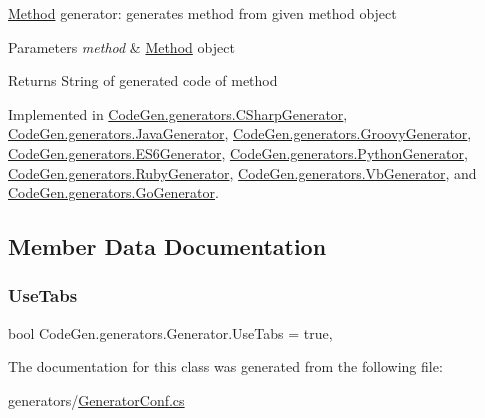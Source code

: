 \mbox{\hyperlink{classCodeGen_1_1generators_1_1Method}{Method}} generator\+: generates method from given method object 


\begin{DoxyParams}{Parameters}
{\em method} & \mbox{\hyperlink{classCodeGen_1_1generators_1_1Method}{Method}} object\\
\hline
\end{DoxyParams}
\begin{DoxyReturn}{Returns}
String of generated code of method
\end{DoxyReturn}


Implemented in \mbox{\hyperlink{classCodeGen_1_1generators_1_1CSharpGenerator_af39766dfe9c70d55091f7b8812bf8399}{Code\+Gen.\+generators.\+C\+Sharp\+Generator}}, \mbox{\hyperlink{classCodeGen_1_1generators_1_1JavaGenerator_a01dca6b9662f50fbd4735dbe97c99cc2}{Code\+Gen.\+generators.\+Java\+Generator}}, \mbox{\hyperlink{classCodeGen_1_1generators_1_1GroovyGenerator_a7c8d2446310971e10a24b802bd9c62a0}{Code\+Gen.\+generators.\+Groovy\+Generator}}, \mbox{\hyperlink{classCodeGen_1_1generators_1_1ES6Generator_a4107b28b436462ea13ce60b092c453f2}{Code\+Gen.\+generators.\+E\+S6\+Generator}}, \mbox{\hyperlink{classCodeGen_1_1generators_1_1PythonGenerator_a09ea61b8eb384efcc36aa3574f9cb6a8}{Code\+Gen.\+generators.\+Python\+Generator}}, \mbox{\hyperlink{classCodeGen_1_1generators_1_1RubyGenerator_aa37c187dae8e400b050dcddba10d216b}{Code\+Gen.\+generators.\+Ruby\+Generator}}, \mbox{\hyperlink{classCodeGen_1_1generators_1_1VbGenerator_ab8855feff4b8292c04a53362d270b34d}{Code\+Gen.\+generators.\+Vb\+Generator}}, and \mbox{\hyperlink{classCodeGen_1_1generators_1_1GoGenerator_ac732350d06454ed93f2053c0971c8fd9}{Code\+Gen.\+generators.\+Go\+Generator}}.



\subsection{Member Data Documentation}
\mbox{\label{classCodeGen_1_1generators_1_1Generator_a7a3edb5addb8b879b39666718f32514d}} 
\subsubsection{\texorpdfstring{Use\+Tabs}{UseTabs}}
{\footnotesize\ttfamily bool Code\+Gen.\+generators.\+Generator.\+Use\+Tabs = true\hspace{0.3cm}{\ttfamily [static]}, {\ttfamily [protected]}}







The documentation for this class was generated from the following file\+:\begin{DoxyCompactItemize}
\item 
generators/\mbox{\hyperlink{GeneratorConf_8cs}{Generator\+Conf.\+cs}}\end{DoxyCompactItemize}
